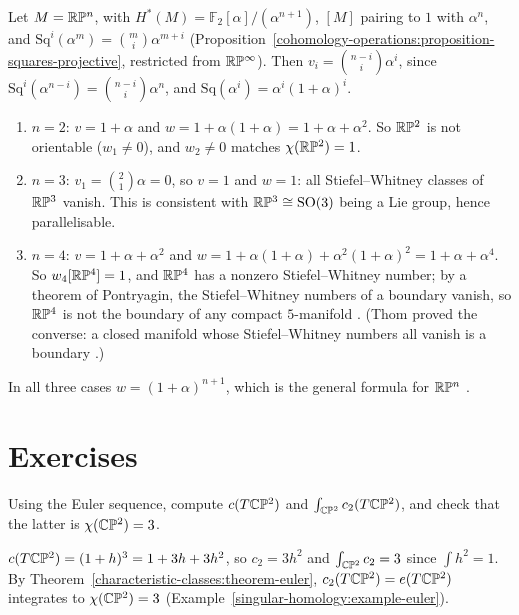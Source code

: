\begin{example}\label{characteristic-classes:example-wu-projective}
Let $M = \mathbb{R}\mathbb{P}^n$, with $H^*(M) = \mathbb{F}_2[\alpha]/(\alpha^{n+1})$, $[M]$ pairing to $1$ with $\alpha^n$, and $\mathrm{Sq}^i(\alpha^m) = \binom{m}{i}\alpha^{m+i}$
(Proposition~\ref{cohomology-operations:proposition-squares-projective}, restricted from $\mathbb{R}\mathbb{P}^\infty$). Then $v_i = \binom{n-i}{i}\alpha^i$, since
$\mathrm{Sq}^i(\alpha^{n-i}) = \binom{n-i}{i}\alpha^n$, and $\mathrm{Sq}(\alpha^i) = \alpha^i(1 + \alpha)^i$.
\begin{enumerate}
\item $n = 2$: $v = 1 + \alpha$ and $w = 1 + \alpha(1 + \alpha) = 1 + \alpha + \alpha^2$. So $\mathbb{R}\mathbb{P}^2$ is not orientable ($w_1 \neq 0$), and
$w_2 \neq 0$ matches $\chi(\mathbb{R}\mathbb{P}^2) = 1$.
\item $n = 3$: $v_1 = \binom{2}{1}\alpha = 0$, so $v = 1$ and $w = 1$: all Stiefel--Whitney classes of $\mathbb{R}\mathbb{P}^3$ vanish. This is consistent with
$\mathbb{R}\mathbb{P}^3 \cong \mathrm{SO}(3)$ being a Lie group, hence parallelisable.
\item $n = 4$: $v = 1 + \alpha + \alpha^2$ and $w = 1 + \alpha(1 + \alpha) + \alpha^2(1 + \alpha)^2 = 1 + \alpha + \alpha^4$. So $w_4[\mathbb{R}\mathbb{P}^4] = 1$, and
$\mathbb{R}\mathbb{P}^4$ has a nonzero Stiefel--Whitney number; by a theorem of Pontryagin, the Stiefel--Whitney numbers of a boundary vanish, so
$\mathbb{R}\mathbb{P}^4$ is not the boundary of any compact $5$-manifold \cite[Chapter 4]{milnor-stasheff}. (Thom proved the converse: a closed manifold whose
Stiefel--Whitney numbers all vanish is a boundary \cite{thom-1954}.)
\end{enumerate}
In all three cases $w = (1 + \alpha)^{n+1}$, which is the general formula for $\mathbb{R}\mathbb{P}^n$ \cite[Chapter 4]{milnor-stasheff}.
\end{example}

\section{Exercises}\label{characteristic-classes:section-exercises}

\begin{exercise}\label{characteristic-classes:exercise-chern-projective}
Using the Euler sequence, compute $c(T\mathbb{C}\mathbb{P}^2)$ and $\int_{\mathbb{C}\mathbb{P}^2}c_2(T\mathbb{C}\mathbb{P}^2)$, and check that the latter is $\chi(\mathbb{C}\mathbb{P}^2) = 3$.
\end{exercise}

\begin{solution}
$c(T\mathbb{C}\mathbb{P}^2) = (1 + h)^3 = 1 + 3h + 3h^2$, so $c_2 = 3h^2$ and $\int_{\mathbb{C}\mathbb{P}^2}c_2 = 3$ since $\int h^2 = 1$. By Theorem~\ref{characteristic-classes:theorem-euler}, $c_2(T\mathbb{C}\mathbb{P}^2) = e(T\mathbb{C}\mathbb{P}^2)$ integrates to
$\chi(\mathbb{C}\mathbb{P}^2) = 3$ (Example~\ref{singular-homology:example-euler}).
\end{solution}

